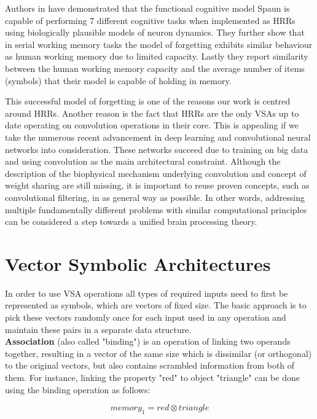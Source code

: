 \documentclass[conference]{IEEEtran}
\begin{document}
	
	Authors in \cite{Eliasmith:2012:LargeScaleModel} have demonstrated that the functional cognitive model Spaun is capable of performing 7 different cognitive tasks when implemented as HRRs using biologically plausible models of neuron dynamics.
They further show that in serial working memory tasks the model of forgetting exhibits similar behaviour as human working memory due to limited capacity.
Lastly they report similarity between the human working memory capacity and the average number of items (symbols) that their model is capable of holding in memory.

	This successful model of forgetting is one of the reasons our work is centred around HRRs. Another reason is the fact that HRRs are the only VSAs up to date operating on convolution operations in their core.
This is appealing if we take the numerous recent advancement in deep learning and convolutional neural networks into consideration.
These networks succeed due to training on big data and using convolution as the main architectural constraint.
Although the description of the biophysical mechanism underlying convolution and concept of weight sharing are still missing, it is important to reuse proven concepts, such as convolutional filtering, in as general way as possible.
In other words, addressing multiple fundamentally different problems with similar computational principles can be considered a step towards a unified brain processing theory.
	
	\section{Vector Symbolic Architectures}
	
In order to use VSA operations all types of required inputs need to first be represented as symbols, which are vectors of fixed size. The basic approach is to pick these vectors randomly once for each input used in any operation and maintain these pairs in a separate data structure.	
	\\
	
	\textbf{Association} (also called "binding") is an operation of linking two operands together, resulting in a vector of the same size which is dissimilar (or orthogonal) to the original vectors, but also contains scrambled information from both of them.
For instance, linking the property "red" to object "triangle" can be done using the binding operation as follows:
	
	\begin{equation}
	memory_1 = red \otimes triangle
	\end{equation}
	
\end{document}
